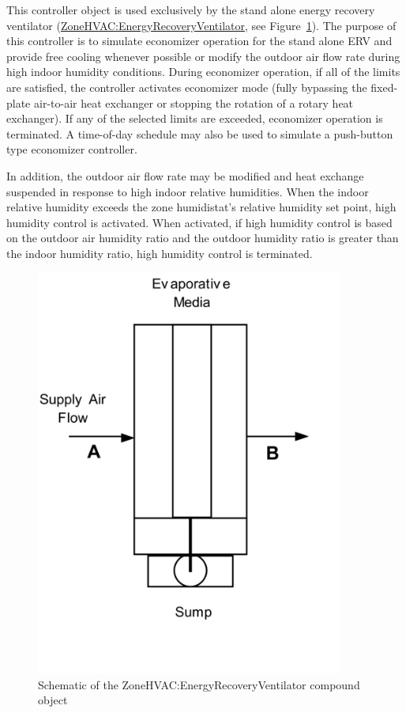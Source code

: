 This controller object is used exclusively by the stand alone energy recovery ventilator (\hyperref[zonehvacenergyrecoveryventilator]{ZoneHVAC:EnergyRecoveryVentilator}, see Figure~\ref{fig:schematic-of-the-zonehvac}). The purpose of this controller is to simulate economizer operation for the stand alone ERV and provide free cooling whenever possible or modify the outdoor air flow rate during high indoor humidity conditions. During economizer operation, if all of the limits are satisfied, the controller activates economizer mode (fully bypassing the fixed-plate air-to-air heat exchanger or stopping the rotation of a rotary heat exchanger). If any of the selected limits are exceeded, economizer operation is terminated. A time-of-day schedule may also be used to simulate a push-button type economizer controller.

In addition, the outdoor air flow rate may be modified and heat exchange suspended in response to high indoor relative humidities. When the indoor relative humidity exceeds the zone humidistat's relative humidity set point, high humidity control is activated. When activated, if high humidity control is based on the outdoor air humidity ratio and the outdoor humidity ratio is greater than the indoor humidity ratio, high humidity control is terminated.

\begin{figure}[hbtp] %
\centering
\includegraphics[width=0.9\textwidth, height=0.9\textheight, keepaspectratio=true]{media/image414.png}
\caption{Schematic of the ZoneHVAC:EnergyRecoveryVentilator compound object \protect \label{fig:schematic-of-the-zonehvac}}
\end{figure}


